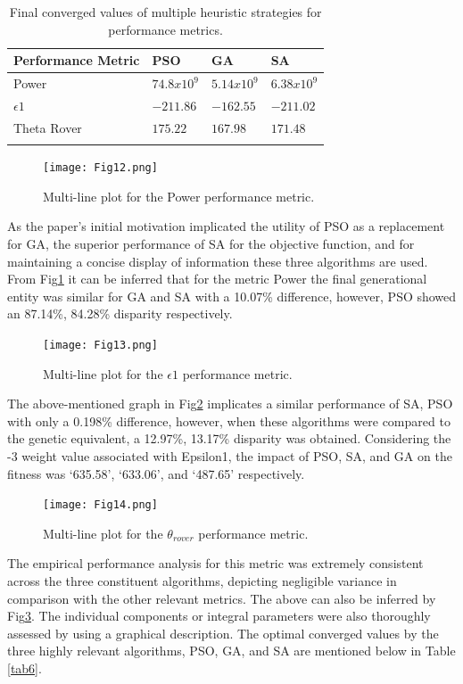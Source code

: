 \documentclass[default,iicol]{sn-jnl}
\theoremstyle{thmstyleone}
\theoremstyle{thmstyletwo}
\theoremstyle{thmstylethree}
\begin{document}
\begin{table}[ht]
\begin{minipage}{174pt}
\caption{ Final converged values of multiple heuristic strategies for performance metrics.}\label{tab5}%
\begin{tabular}{@{}llll@{}}
\toprule
Performance Metric & PSO & GA & SA \\
\midrule
Power & $ 74.8x10^9$ & $5.14x10^9$ & $6.38x10^9$ \\
$\epsilon 1$ & $-211.86$ & $-162.55$ & $-211.02$ \\
Theta Rover & $175.22$ & $167.98$ & $171.48$ \\
\botrule
\end{tabular}
\end{minipage}
\end{table}

\begin{figure}[ht]
\centering
\texttt{[image: Fig12.png]}
\caption{Multi-line plot for the Power performance metric.}\label{fig12}
\end{figure}
As the paper’s initial motivation implicated the utility of PSO as a replacement for GA, the superior performance of SA for the objective function, and for maintaining a concise display of information these three algorithms are used. From Fig\ref{fig12} it can be inferred that for the metric Power the final generational entity was similar for GA and SA with a 10.07\% difference, however, PSO showed an 87.14\%, 84.28\% disparity respectively.

\begin{figure}[ht]
\centering
\texttt{[image: Fig13.png]}
\caption{Multi-line plot for the $\epsilon 1 $ performance metric.}\label{fig13}
\end{figure}

The above-mentioned graph in Fig\ref{fig13} implicates a similar performance of SA, PSO with only a 0.198\% difference, however, when these algorithms were compared to the genetic equivalent, a 12.97\%, 13.17\% disparity was obtained. Considering the -3 weight value associated with Epsilon1, the impact of PSO, SA, and GA on the fitness was ‘635.58’, ‘633.06’, and ‘487.65’ respectively. 

\begin{figure}[ht]
\centering
\texttt{[image: Fig14.png]}
\caption{Multi-line plot for the $\theta_{rover}$ performance metric.}\label{fig14}
\end{figure}

The empirical performance analysis for this metric was extremely consistent across the three constituent algorithms, depicting negligible variance in comparison with the other relevant metrics. The above can also be inferred by Fig\ref{fig14}.
The individual components or integral parameters were also thoroughly assessed by using a graphical description. The optimal converged values by the three highly relevant algorithms, PSO, GA, and SA are mentioned below in Table \ref{tab6}.
\end{document}
